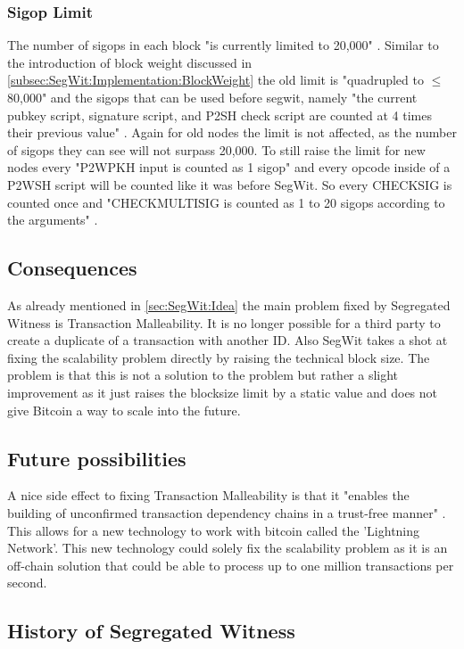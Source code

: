 \subsubsection{Sigop Limit}
\label{subsec:SegWit:Implementation:SigopLimit}
The number of sigops in each block "is currently limited to 20,000" \cite{bip-141}. Similar to the introduction of block weight discussed in \autoref{subsec:SegWit:Implementation:BlockWeight} the old limit is "quadrupled to $\leq$ 80,000" \cite{bip-141} and the sigops that can be used before segwit, namely "the current pubkey script, signature script, and P2SH check script are counted at 4 times their previous value" \cite{bip-141}. Again for old nodes the limit is not affected, as the number of sigops they can see will not surpass 20,000. To still raise the limit for new nodes every "P2WPKH input is counted as 1 sigop" \cite{bip-141} and every opcode inside of a P2WSH script will be counted like it was before SegWit. So every CHECKSIG is counted once and "CHECKMULTISIG is counted as 1 to 20 sigops according to the arguments" \cite{bip-141}.


\subsection{Consequences}
\label{sec:SegWit:Consequences}
As already mentioned in \autoref{sec:SegWit:Idea} the main problem fixed by Segregated Witness is Transaction Malleability. It is no longer possible for a third party to create a duplicate of a transaction with another ID. Also SegWit takes a shot at fixing the scalability problem directly by raising the technical block size. The problem is that this is not a solution to the problem but rather a slight improvement as it just raises the blocksize limit by a static value and does not give Bitcoin a way to scale into the future.

\subsection{Future possibilities}
\label{sec:SegWit:Future}
A nice side effect to fixing Transaction Malleability is that it "enables the building of unconfirmed transaction dependency chains in a trust-free manner" \cite{bip-141}. This allows for a new technology to work with bitcoin called the 'Lightning Network'. This new technology could solely fix the scalability problem as it is an off-chain solution that could be able to process up to one million transactions per second. 

\subsection{History of Segregated Witness}
\label{sec:SegWit:History}

